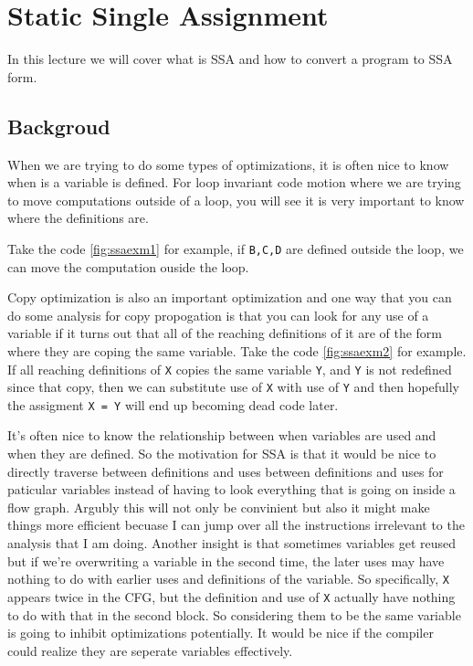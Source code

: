 \section{Static Single Assignment}

In this lecture we will cover what is SSA and how to convert a program to SSA form.

\subsection{Backgroud}

When we are trying to do some types of optimizations, it is often nice to know when is a variable is defined.
For loop invariant code motion where we are trying to move computations outside of a loop, you will see it is very important to 
know where the definitions are.



Take the code \ref{fig:ssaexm1} for example, if \texttt{B,C,D} are defined outside the loop, we can move the computation ouside the loop.



Copy optimization is also an important optimization and one way that you can do some analysis for copy propogation is that you can 
look for any use of a variable if it turns out that all of the reaching definitions of it are of the form where they are coping the same 
variable. Take the code \ref{fig:ssaexm2} for example. If all reaching definitions of \texttt{X} copies the same variable \texttt{Y}, and \texttt{Y} is not 
redefined since that copy, then we can substitute use of \texttt{X} with use of \texttt{Y} and then hopefully the assigment \texttt{X = Y} will end up becoming dead code later.

It's often nice to know the relationship between when variables are used and when they are defined. So the motivation for SSA is that it would be nice to directly traverse between definitions and uses 
between definitions and uses for paticular variables instead of having to look everything that is going on inside a flow graph. Argubly this will not only be convinient but also it might make things more efficient becuase I 
can jump over all the instructions irrelevant to the analysis that I am doing. Another insight is that sometimes variables get reused but if we're overwriting a variable in the second time, the later 
uses may have nothing to do with earlier uses and definitions of the variable. So specifically, \texttt{X} appears twice in the CFG, but the definition and use of \texttt{X} actually have nothing to do with that in the second block.
So considering them to be the same variable is going to inhibit optimizations potentially. It would be nice if the compiler could realize they are seperate variables effectively.


